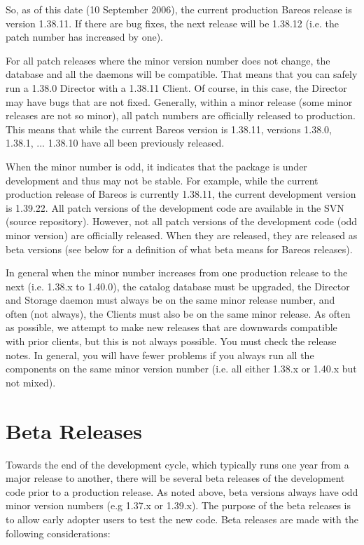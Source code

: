 So, as of this date (10 September 2006), the current production Bareos
release is version 1.38.11.  If there are bug fixes, the next release
will be 1.38.12 (i.e. the patch number has increased by one).

For all patch releases where the minor version number does not change,
the database and all the daemons will be compatible.  That means that
you can safely run a 1.38.0 Director with a 1.38.11 Client.  Of course,
in this case, the Director may have bugs that are not fixed. Generally,
within a minor release (some minor releases are not so minor), all
patch numbers are officially released to production. This means that while
the current Bareos version is 1.38.11, versions 1.38.0, 1.38.1, ... 1.38.10
have all been previously released.

When the minor number is odd, it indicates that the package is under
development and thus may not be stable. For example, while the current
production release of Bareos is currently 1.38.11, the current development
version is 1.39.22. All patch versions of the development code are
available in the SVN (source repository).  However, not all patch versions
of the development code (odd minor version) are officially released. When
they are released, they are released as beta versions (see below for a
definition of what beta means for Bareos releases).

In general when the minor number increases from one production release
to the next (i.e. 1.38.x to 1.40.0), the catalog database must be upgraded,
the Director and Storage daemon must always be on the same minor release
number, and often (not always), the Clients must also be on the same minor
release. As often as possible, we attempt to make new releases that are
downwards compatible with prior clients, but this is not always possible.
You must check the release notes.  In general, you will have fewer problems
if you always run all the components on the same minor version number (i.e.
all either 1.38.x or 1.40.x but not mixed).


\label{BetaReleases}
\section*{Beta Releases}
Towards the end of the development cycle, which typically runs
one year from a major release to another, there will be several beta
releases of the development code prior to a production release.
As noted above, beta versions always have odd minor version numbers
(e.g 1.37.x or 1.39.x).
The purpose of the beta releases is to allow early adopter users to test
the new code.  Beta releases are made with the following considerations:

